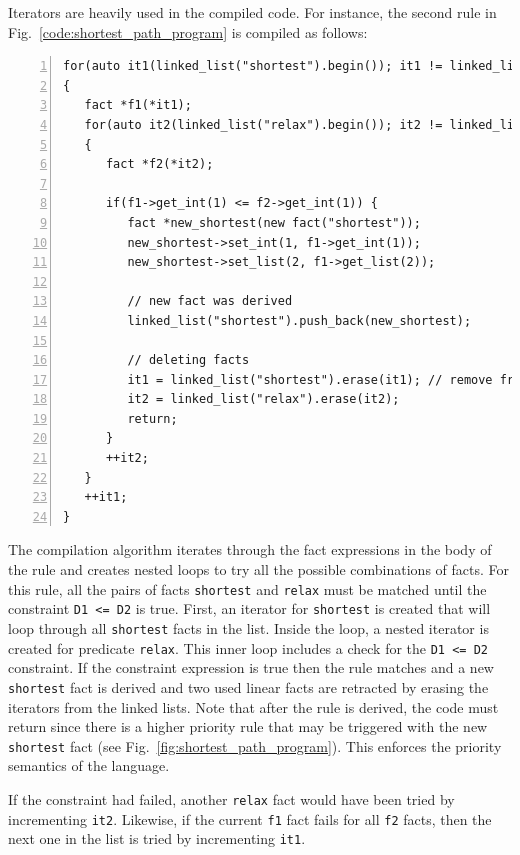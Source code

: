 Iterators are heavily used in the compiled code. For instance, the second rule in
Fig.~\ref{code:shortest_path_program} is compiled as follows:

\begin{Verbatim}[numbers=left,fontsize=\scriptsize]
for(auto it1(linked_list("shortest").begin()); it1 != linked_list("shortest").end(); )
{
   fact *f1(*it1);
   for(auto it2(linked_list("relax").begin()); it2 != linked_list("relax").end(); )
   {
      fact *f2(*it2);

      if(f1->get_int(1) <= f2->get_int(1)) {
         fact *new_shortest(new fact("shortest"));
         new_shortest->set_int(1, f1->get_int(1));
         new_shortest->set_list(2, f1->get_list(2));

         // new fact was derived
         linked_list("shortest").push_back(new_shortest);

         // deleting facts
         it1 = linked_list("shortest").erase(it1); // remove from list
         it2 = linked_list("relax").erase(it2);
         return;
      }
      ++it2;
   }
   ++it1;
}
\end{Verbatim}


The compilation algorithm iterates through the fact expressions in the body of
the rule and creates nested loops to try all the possible combinations of facts.
For this rule, all the pairs of facts \texttt{shortest} and \texttt{relax} must
be matched until the constraint \texttt{D1 <= D2} is true. First, an iterator
for \texttt{shortest} is created that will loop through all \texttt{shortest}
facts in the list. Inside the loop, a nested iterator is created for predicate
\texttt{relax}. This inner loop includes a check for the \texttt{D1 <= D2}
constraint. If the constraint expression is true then the rule matches and a new
\texttt{shortest} fact is derived and two used linear facts are retracted by
erasing the iterators from the linked lists. Note that after the rule is
derived, the code must return since there is a higher priority rule that may be
triggered with the new \texttt{shortest} fact (see
Fig.~\ref{fig:shortest_path_program}). This enforces the priority semantics
of the language.
    
If the constraint had failed, another \texttt{relax} fact would have been tried
by incrementing \texttt{it2}. Likewise, if the current \texttt{f1} fact fails
for all \texttt{f2} facts, then the next one in the list is tried
by incrementing \texttt{it1}.

